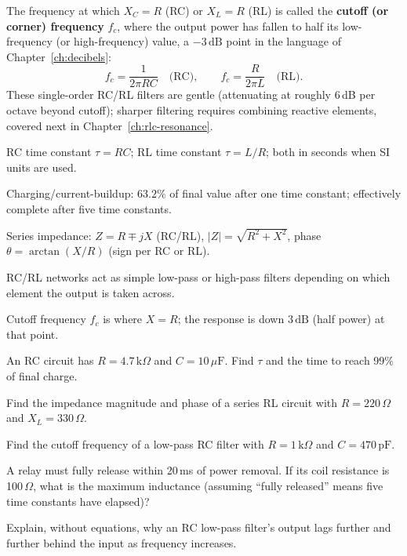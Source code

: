 The frequency at which $X_C = R$ (RC) or $X_L = R$ (RL) is called the
\textbf{cutoff (or corner) frequency} $f_c$, where the output power has
fallen to half its low-frequency (or high-frequency) value, a
$-3\,\text{dB}$ point in the language of Chapter~\ref{ch:decibels}:
\[
f_c = \frac{1}{2\pi RC} \quad \text{(RC)}, \qquad f_c = \frac{R}{2\pi L} \quad \text{(RL)}.
\]
These single-order RC/RL filters are gentle (attenuating at roughly
6\,dB per octave beyond cutoff); sharper filtering requires combining
reactive elements, covered next in Chapter~\ref{ch:rlc-resonance}.

\begin{quickreview}
\item RC time constant $\tau = RC$; RL time constant $\tau = L/R$; both
in seconds when SI units are used.
\item Charging/current-buildup: $63.2\%$ of final value after one time
constant; effectively complete after five time constants.
\item Series impedance: $Z = R \mp jX$ (RC/RL), $|Z|=\sqrt{R^2+X^2}$,
phase $\theta = \arctan(X/R)$ (sign per RC or RL).
\item RC/RL networks act as simple low-pass or high-pass filters
depending on which element the output is taken across.
\item Cutoff frequency $f_c$ is where $X = R$; the response is down
$3\,\text{dB}$ (half power) at that point.
\end{quickreview}

\begin{practiceproblems}
\item An RC circuit has $R=4.7\,\text{k}\Omega$ and $C=10\,\mu\text{F}$.
Find $\tau$ and the time to reach 99\% of final charge.
\item Find the impedance magnitude and phase of a series RL circuit with
$R=220\,\Omega$ and $X_L=330\,\Omega$.
\item Find the cutoff frequency of a low-pass RC filter with
$R=1\,\text{k}\Omega$ and $C=470\,\text{pF}$.
\item A relay must fully release within 20\,ms of power removal. If its
coil resistance is 100\,$\Omega$, what is the maximum inductance
(assuming ``fully released'' means five time constants have elapsed)?
\item Explain, without equations, why an RC low-pass filter's output
lags further and further behind the input as frequency increases.
\end{practiceproblems}
